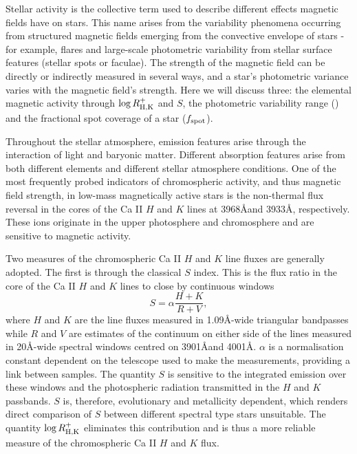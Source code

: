 Stellar activity is the collective term used to describe different effects magnetic fields have on stars.
This name arises from the variability phenomena occurring from structured magnetic fields emerging from the convective envelope of stars - for example, flares and large-scale photometric variability from stellar surface features (stellar spots or faculae).
The strength of the magnetic field can be directly or indirectly measured in several ways, and a star's photometric variance varies with the magnetic field's strength.
Here we will discuss three: the elemental magnetic activity through $\log R^{+}_{\rm{H,K}}$ and $S$, the photometric variability range (\rper) and the fractional spot coverage of a star ($f_{\rm{spot}}$).

Throughout the stellar atmosphere, emission features arise through the interaction of light and baryonic matter. 
Different absorption features arise from both different elements and different stellar atmosphere conditions.
One of the most frequently probed indicators of chromospheric activity, and thus magnetic field strength, in low-mass magnetically active stars is the non-thermal flux reversal in the cores of the Ca II $H$ and $K$ lines at 3968\AA and 3933\AA, respectively.
These ions originate in the upper photosphere and chromosphere and are sensitive to magnetic activity.

Two measures of the chromospheric Ca II $H$ and $K$ line fluxes are generally adopted.
The first is through the classical $S$ index.
This is the flux ratio in the core of the Ca II $H$ and $K$ lines to close by continuous windows
\begin{equation}
S = \alpha \frac{H+K}{R+V},
\end{equation}
where $H$ and $K$ are the line fluxes measured in 1.09\AA-wide triangular bandpasses while $R$ and $V$ are estimates of the continuum on either side of the lines measured in 20\AA-wide spectral windows centred on 3901\AA and 4001\AA. 
$\alpha$ is a normalisation constant dependent on the telescope used to make the measurements, providing a link between samples.
The quantity $S$ is sensitive to the integrated emission over these windows and the photospheric radiation transmitted in the $H$ and $K$ passbands. 
$S$ is, therefore, evolutionary and metallicity dependent, which renders direct comparison of $S$ between different spectral type stars unsuitable.
The quantity $\log R^{+}_{\rm{H,K}}$ eliminates this contribution \citep[See ]{lorenzo_solar_2018} and is thus a more reliable measure of the chromospheric Ca II $H$ and $K$ flux.


